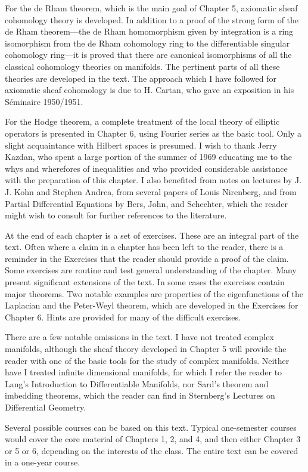 For the de Rham theorem, which is the main goal of Chapter 5, axiomatic sheaf cohomology theory is developed. In addition to a proof of the strong form of the de Rham theorem—the de Rham homomorphism given by integration is a ring isomorphism from the de Rham cohomology ring to the differentiable singular cohomology ring—it is proved that there are canonical isomorphisms of all the classical cohomology theories on manifolds. The pertinent parts of all these theories are developed in the text. The approach which I have followed for axiomatic sheaf cohomology is due to H. Cartan, who gave an exposition in his Séminaire 1950/1951.

For the Hodge theorem, a complete treatment of the local theory of elliptic operators is presented in Chapter 6, using Fourier series as the basic tool. Only a slight acquaintance with Hilbert spaces is presumed. I wish to thank Jerry Kazdan, who spent a large portion of the summer of 1969 educating me to the whys and wherefores of inequalities and who provided considerable assistance with the preparation of this chapter. I also benefited from notes on lectures by J. J. Kohn and Stephen Andrea, from several papers of Louis Nirenberg, and from Partial Differential Equations by Bers, John, and Schechter, which the reader might wish to consult for further references to the literature.

At the end of each chapter is a set of exercises. These are an integral part of the text. Often where a claim in a chapter has been left to the reader, there is a reminder in the Exercises that the reader should provide a proof of the claim. Some exercises are routine and test general understanding of the chapter. Many present significant extensions of the text. In some cases the exercises contain major theorems. Two notable examples are properties of the eigenfunctions of the Laplacian and the Peter-Weyl theorem, which are developed in the Exercises for Chapter 6. Hints are provided for many of the difficult exercises.

There are a few notable omissions in the text. I have not treated complex manifolds, although the sheaf theory developed in Chapter 5 will provide the reader with one of the basic tools for the study of complex manifolds. Neither have I treated infinite dimensional manifolds, for which I refer the reader to Lang's Introduction to Differentiable Manifolds, nor Sard's theorem and imbedding theorems, which the reader can find in Sternberg's Lectures on Differential Geometry.

Several possible courses can be based on this text. Typical one-semester courses would cover the core material of Chapters 1, 2, and 4, and then either Chapter 3 or 5 or 6, depending on the interests of the class. The entire text can be covered in a one-year course.

